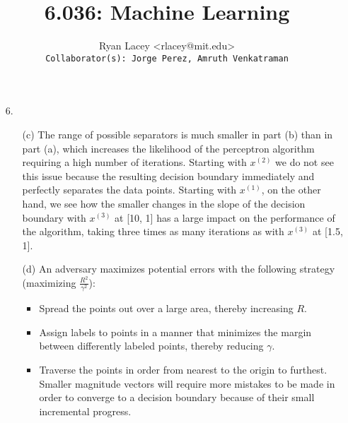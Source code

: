 \documentclass{article}
\begin{document}

\title{6.036: Machine Learning}
\author{
  Ryan Lacey <rlacey@mit.edu>\\
  \footnotesize \texttt{Collaborator(s): Jorge Perez, Amruth Venkatraman}
}
        
\maketitle
        


\begin{enumerate}
\item[6.]
	\begin{enumerate}
	\item[(c)] 
		        The range of possible separators is much smaller in part (b) than in part (a), which increases the likelihood of the perceptron algorithm requiring a high number of iterations. Starting with $x^{(2)}$ we do not see this issue because the resulting decision boundary immediately and perfectly separates the data points. Starting with $x^{(1)}$, on the other hand, we see how the smaller changes in the slope of the decision boundary with $x^{(3)}$ at [10, 1] has a large impact on the performance of the algorithm, taking three times as many iterations as with $x^{(3)}$ at [1.5, 1].
	\item[(d)] 
		        An adversary maximizes potential errors with the following strategy (maximizing $\frac{R^2}{\gamma^2}$):
		        \begin{itemize}
		          \item Spread the points out over a large area, thereby increasing $R$.
		          \item Assign labels to points in a manner that minimizes the margin between differently labeled points, thereby reducing $\gamma$. 
		          \item Traverse the points in order from nearest to the origin to furthest. Smaller magnitude vectors will require more mistakes to be made in order to converge to a decision boundary because of their small incremental progress.
		        \end{itemize}
	\end{enumerate}

\bigskip


\end{enumerate}
\end{document}
